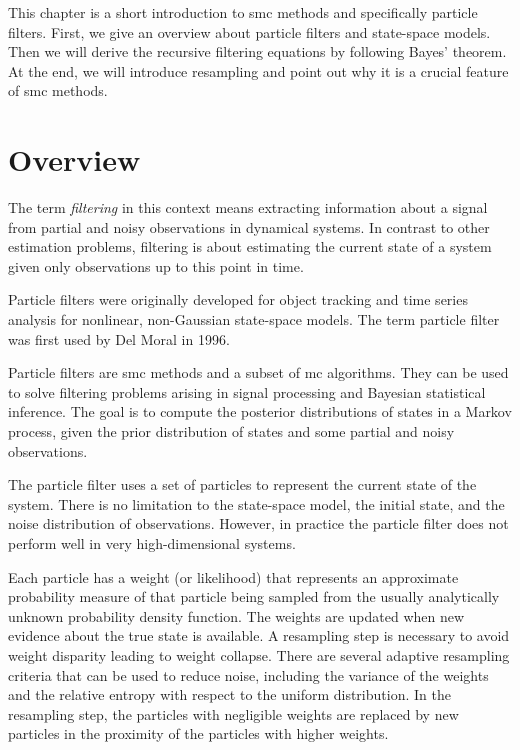 
This chapter is a short introduction to \gls{smc} methods and specifically particle filters. First, we give an overview about particle filters and state-space models. Then we will derive the recursive filtering equations by following Bayes' theorem. At the end, we will introduce resampling and point out why it is a crucial feature of \gls{smc} methods.

\section{Overview}

The term \textit{filtering} in this context means extracting information about a signal from partial and noisy observations in dynamical systems. In contrast to other estimation problems, filtering is about estimating the current state of a system given only observations up to this point in time.\cite{AppliedOptimalEstimation}

Particle filters were originally developed for object tracking and time series analysis for nonlinear, non-Gaussian state-space models.\cite{Gordon1993} The term particle filter was first used by Del Moral in 1996.\cite{Moral1996}

Particle filters are \gls{smc} methods and a subset of \gls{mc} algorithms. They can be used to solve filtering problems arising in signal processing and Bayesian statistical inference. The goal is to compute the posterior distributions of states in a Markov process, given the prior distribution of states and some partial and noisy observations.\cite{Doucet2011}

The particle filter uses a set of particles to represent the current state of the system. There is no limitation to the state-space model, the initial state, and the noise distribution of observations. However, in practice the particle filter does not perform well in very high-dimensional systems.\cite{Doucet2011}

Each particle has a weight (or likelihood) that represents an approximate probability measure of that particle being sampled from the usually analytically unknown probability density function. The weights are updated when new evidence about the true state is available. A resampling step is necessary to avoid weight disparity leading to weight collapse. There are several adaptive resampling criteria that can be used to reduce noise, including the variance of the weights and the relative entropy with respect to the uniform distribution. In the resampling step, the particles with negligible weights are replaced by new particles in the proximity of the particles with higher weights.\cite{Moral1996}\cite{Moral2012}

